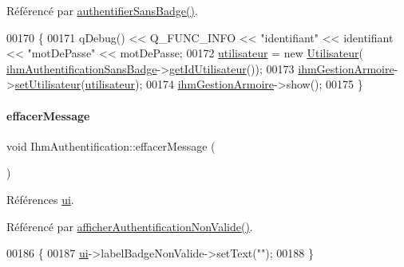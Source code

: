 Référencé par \hyperlink{class_ihm_authentification_af7427fc32a32954401a8792f5672ad19}{authentifier\+Sans\+Badge()}.


\begin{DoxyCode}
00170 \{
00171     qDebug() << Q\_FUNC\_INFO << \textcolor{stringliteral}{"identifiant"} << identifiant << \textcolor{stringliteral}{"motDePasse"} << motDePasse;
00172     \hyperlink{class_ihm_authentification_ad08cee96c59182c27198907491f0c963}{utilisateur} = \textcolor{keyword}{new} \hyperlink{class_utilisateur}{Utilisateur}(
      \hyperlink{class_ihm_authentification_a9444198403beeaf7386488d56f8ad7f2}{ihmAuthentificationSansBadge}->\hyperlink{class_ihm_authentification_sans_badge_acd5fea74d025db830e6e880e55d5c2f0}{getIdUtilisateur}());
00173     \hyperlink{class_ihm_authentification_a6ce06a3dbea8b929c3ddffdba011c01f}{ihmGestionArmoire}->\hyperlink{class_ihm_gestion_armoire_af63a0c4424edd90a3c45506dde527b4e}{setUtilisateur}(\hyperlink{class_ihm_authentification_ad08cee96c59182c27198907491f0c963}{utilisateur});
00174     \hyperlink{class_ihm_authentification_a6ce06a3dbea8b929c3ddffdba011c01f}{ihmGestionArmoire}->show();
00175 \}
\end{DoxyCode}
\mbox{\label{class_ihm_authentification_a67dcacabc50a01245badd2d9268253a4}} 
\paragraph{\texorpdfstring{effacer\+Message}{effacerMessage}}
{\footnotesize\ttfamily void Ihm\+Authentification\+::effacer\+Message (\begin{DoxyParamCaption}{ }\end{DoxyParamCaption})\hspace{0.3cm}{\ttfamily [slot]}}



Références \hyperlink{class_ihm_authentification_a2bab782e7f65474f2817c3916ded9d18}{ui}.



Référencé par \hyperlink{class_ihm_authentification_a91a8934658e317870fb6b931608824db}{afficher\+Authentification\+Non\+Valide()}.


\begin{DoxyCode}
00186 \{
00187     \hyperlink{class_ihm_authentification_a2bab782e7f65474f2817c3916ded9d18}{ui}->labelBadgeNonValide->setText(\textcolor{stringliteral}{""});
00188 \}
\end{DoxyCode}
\mbox{\label{class_ihm_authentification_a4698f8d828773e365104d78e3ac3b9ce}} 
